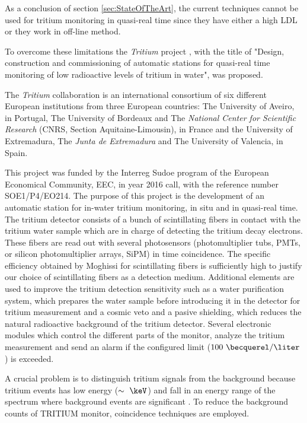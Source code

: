 As a conclusion of section \ref{sec:StateOfTheArt}, the current techniques cannot be used for tritium monitoring in quasi-real time since they have either a high LDL or they work in off-line method. 

To overcome these limitations the \textit{Tritium} project \cite{TRITIUM}, with the title of "Design, construction and commissioning of automatic stations for quasi-real time monitoring of low radioactive levels of tritium in water", was proposed.

The \textit{Tritium} collaboration is an international consortium of six different European institutions from three European countries: The University of Aveiro, in Portugal, The University of Bordeaux and The \textit{National Center for Scientific Research} (CNRS, Section Aquitaine-Limousin), in France and the University of Extremadura, The \textit{Junta de Extremadura} and The University of Valencia, in Spain.

This project was funded by the Interreg Sudoe program of the European Economical Community, EEC, in year 2016 call, with the reference number SOE1/P4/EO214. The purpose of this project is the development of an automatic station for in-water tritium monitoring, in situ and in quasi-real time. The tritium detector consists of a bunch of scintillating fibers in contact with the tritium water sample which are in charge of detecting the tritium decay electrons. These fibers are read out with several photosensors (photomultiplier tubs, PMTs, or silicon photomultiplier arrays, SiPM) in time coincidence. The specific efficiency obtained by Moghissi for scintillating fibers is sufficiently high to justify our choice of scintillating fibers as a detection medium. Additional elements are used to improve the tritium detection sensitivity such as a water purification system, which prepares the water sample before introducing it in the detector for tritium measurement and a cosmic veto and a pasive shielding, which reduces the natural radioactive background of the tritium detector. Several electronic modules which control the different parts of the monitor, analyze the tritium measurement and send an alarm if the configured limit ($100~\becquerel/\liter$) is exceeded.

A crucial problem is to distinguish tritium signals from the background because tritium events has low energy ($\sim~\keV$) and fall in an energy range of the spectrum where background events are significant . To reduce the background counts of TRITIUM monitor, coincidence techniques are employed.

